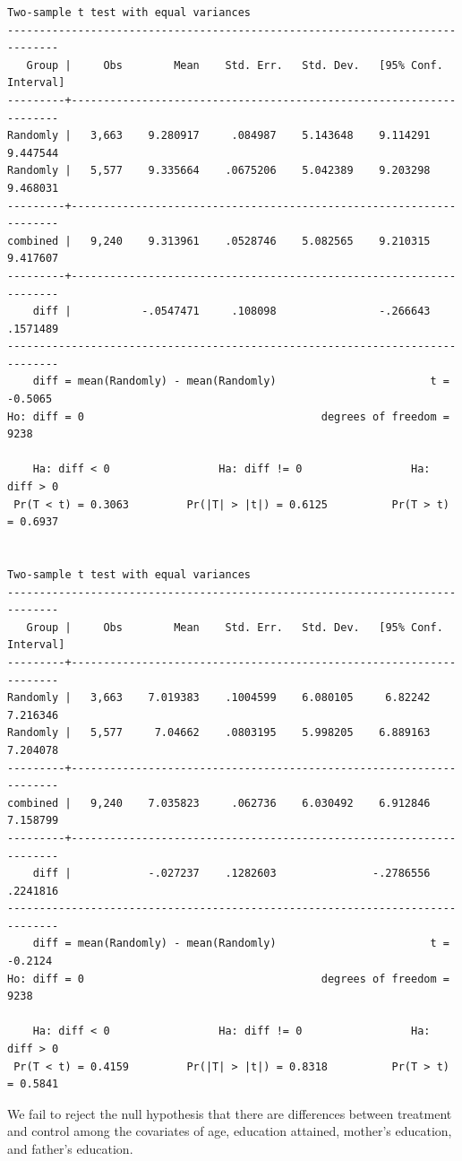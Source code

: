\documentclass[
]{book}
\begin{document}
\begin{verbatim}
Two-sample t test with equal variances
------------------------------------------------------------------------------
   Group |     Obs        Mean    Std. Err.   Std. Dev.   [95% Conf. Interval]
---------+--------------------------------------------------------------------
Randomly |   3,663    9.280917     .084987    5.143648    9.114291    9.447544
Randomly |   5,577    9.335664    .0675206    5.042389    9.203298    9.468031
---------+--------------------------------------------------------------------
combined |   9,240    9.313961    .0528746    5.082565    9.210315    9.417607
---------+--------------------------------------------------------------------
    diff |           -.0547471     .108098                -.266643    .1571489
------------------------------------------------------------------------------
    diff = mean(Randomly) - mean(Randomly)                        t =  -0.5065
Ho: diff = 0                                     degrees of freedom =     9238

    Ha: diff < 0                 Ha: diff != 0                 Ha: diff > 0
 Pr(T < t) = 0.3063         Pr(|T| > |t|) = 0.6125          Pr(T > t) = 0.6937


Two-sample t test with equal variances
------------------------------------------------------------------------------
   Group |     Obs        Mean    Std. Err.   Std. Dev.   [95% Conf. Interval]
---------+--------------------------------------------------------------------
Randomly |   3,663    7.019383    .1004599    6.080105     6.82242    7.216346
Randomly |   5,577     7.04662    .0803195    5.998205    6.889163    7.204078
---------+--------------------------------------------------------------------
combined |   9,240    7.035823     .062736    6.030492    6.912846    7.158799
---------+--------------------------------------------------------------------
    diff |            -.027237    .1282603               -.2786556    .2241816
------------------------------------------------------------------------------
    diff = mean(Randomly) - mean(Randomly)                        t =  -0.2124
Ho: diff = 0                                     degrees of freedom =     9238

    Ha: diff < 0                 Ha: diff != 0                 Ha: diff > 0
 Pr(T < t) = 0.4159         Pr(|T| > |t|) = 0.8318          Pr(T > t) = 0.5841
\end{verbatim}

We fail to reject the null hypothesis that there are differences between treatment and control among the covariates of age, education attained, mother's education, and father's education.
\end{document}
